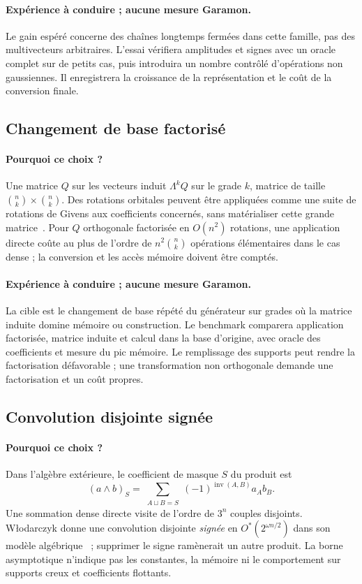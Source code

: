 \documentclass[11pt,a4paper]{article}
\begin{document}
\paragraph{Expérience à conduire ; aucune mesure Garamon.}
Le gain espéré concerne des chaînes longtemps fermées dans cette famille,
pas des multivecteurs arbitraires. L'essai vérifiera amplitudes et signes
avec un oracle complet sur de petits cas, puis introduira un nombre contrôlé
d'opérations non gaussiennes. Il enregistrera la croissance de la
représentation et le coût de la conversion finale.

\subsection{Changement de base factorisé}
\paragraph{Pourquoi ce choix ?}
Une matrice $Q$ sur les vecteurs induit $\Lambda^k Q$ sur le grade $k$,
matrice de taille $\binom nk\times\binom nk$. Des rotations orbitales
peuvent être appliquées comme une suite de rotations de Givens aux
coefficients concernés, sans matérialiser cette grande matrice~\cite{ffsim}.
Pour $Q$ orthogonale factorisée en $O(n^2)$ rotations, une application
directe coûte au plus de l'ordre de $n^2\binom nk$ opérations élémentaires
dans le cas dense ; la conversion et les accès mémoire doivent être comptés.

\paragraph{Expérience à conduire ; aucune mesure Garamon.}
La cible est le changement de base répété du générateur sur grades où la
matrice induite domine mémoire ou construction. Le benchmark comparera
application factorisée, matrice induite et calcul dans la base d'origine,
avec oracle des coefficients et mesure du pic mémoire. Le remplissage des
supports peut rendre la factorisation défavorable ; une transformation
non orthogonale demande une factorisation et un coût propres.

\subsection{Convolution disjointe signée}
\paragraph{Pourquoi ce choix ?}
Dans l'algèbre extérieure, le coefficient de masque $S$ du produit est
\[
 (a\wedge b)_S=
 \sum_{\substack{A\sqcup B=S}}(-1)^{\operatorname{inv}(A,B)}a_A b_B.
\]
Une sommation dense directe visite de l'ordre de $3^n$ couples disjoints.
Włodarczyk donne une convolution disjointe \emph{signée} en
$O^*(2^{\omega n/2})$ dans son modèle algébrique~\cite{wlodarczyk} ;
supprimer le signe ramènerait un autre produit. La borne asymptotique
n'indique pas les constantes, la mémoire ni le comportement sur supports
creux et coefficients flottants.
\end{document}
